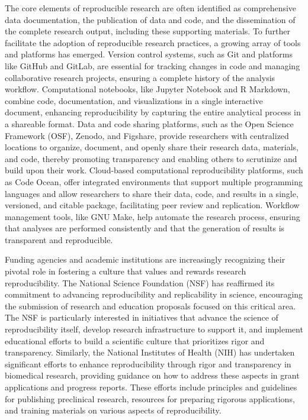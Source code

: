 \documentclass{article}
\begin{document}
The core elements of reproducible research are often identified as comprehensive data documentation, the publication of data and code, and the dissemination of the complete research output, including these supporting materials. To further facilitate the adoption of reproducible research practices, a growing array of tools and platforms has emerged. Version control systems, such as Git and platforms like GitHub and GitLab, are essential for tracking changes in code and managing collaborative research projects, ensuring a complete history of the analysis workflow. Computational notebooks, like Jupyter Notebook and R Markdown, combine code, documentation, and visualizations in a single interactive document, enhancing reproducibility by capturing the entire analytical process in a shareable format. Data and code sharing platforms, such as the Open Science Framework (OSF), Zenodo, and Figshare, provide researchers with centralized locations to organize, document, and openly share their research data, materials, and code, thereby promoting transparency and enabling others to scrutinize and build upon their work. Cloud-based computational reproducibility platforms, such as Code Ocean, offer integrated environments that support multiple programming languages and allow researchers to share their data, code, and results in a single, versioned, and citable package, facilitating peer review and replication. Workflow management tools, like GNU Make, help automate the research process, ensuring that analyses are performed consistently and that the generation of results is transparent and reproducible.

Funding agencies and academic institutions are increasingly recognizing their pivotal role in fostering a culture that values and rewards research reproducibility. The National Science Foundation (NSF) has reaffirmed its commitment to advancing reproducibility and replicability in science, encouraging the submission of research and education proposals focused on this critical area. The NSF is particularly interested in initiatives that advance the science of reproducibility itself, develop research infrastructure to support it, and implement educational efforts to build a scientific culture that prioritizes rigor and transparency. Similarly, the National Institutes of Health (NIH) has undertaken significant efforts to enhance reproducibility through rigor and transparency in biomedical research, providing guidance on how to address these aspects in grant applications and progress reports. These efforts include principles and guidelines for publishing preclinical research, resources for preparing rigorous applications, and training materials on various aspects of reproducibility.
\end{document}
